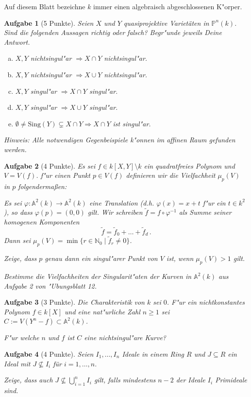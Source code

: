 \documentclass[a4paper, 12pt, numbers=noendperiod, chapterprefix=true, headsepline]{scrbook}
\theoremstyle{break}
\newtheorem{Aufg}{Aufgabe}
\theoremstyle{nonumberbreak}
\theoremstyle{nonumberplain}
\newcommand{\set}[2]{\{#1\mid #2\}} %
\newcommand{\N}{\mathbb{N}}
\newcommand{\A}{\mathbb{A}}
\newcommand{\IP}{\mathbb{P}}%
\begin{document}
Auf diesem Blatt bezeichne $k$ immer einen algebraisch abgeschlossenen K"orper.

\begin{Aufg}[5 Punkte]
Seien $X$ und $Y$ quasiprojektive Variet\"aten in $\IP^n(k)$. Sind die folgenden Aussagen richtig oder falsch? Begr"unde jeweils Deine Antwort.
\begin{enumerate}[a)]
	\item $X,Y$ nichtsingul"ar $\Rightarrow X \cap Y$ nichtsingul"ar.
	\item $X,Y$ nichtsingul"ar $\Rightarrow X \cup Y$ nichtsingul"ar.
	\item $X,Y$ singul"ar $\Rightarrow X \cap Y$ singul"ar.
	\item $X,Y$ singul"ar $\Rightarrow X \cup Y$ singul"ar.
	\item $\emptyset \neq \textrm{Sing}(Y) \subsetneq X \cap Y \Rightarrow X \cap Y$ ist singul"ar.
\end{enumerate}
\emph{Hinweis:} Alle notwendigen Gegenbeispiele k"onnen im affinen Raum gefunden werden.
\end{Aufg}

\begin{Aufg}[4 Punkte]
Es sei $f\in k[X,Y] \setminus k$ ein quadratfreies Polynom und $V = V(f)$. f"ur einen Punkt $p \in V(f)$ definieren wir die Vielfachheit $\mu_p(V)$ in $p$ folgenderma\ss en: 

Es sei $\varphi \colon \A^2(k)\to \A^2(k)$ eine Translation (d.h. $\varphi(x) = x + t$ f"ur ein $t\in k^2$), so dass $\varphi(p) = (0,0)$ gilt. Wir schreiben $\tilde f = f\circ \varphi^{-1}$ als Summe seiner homogenen Komponenten
	\[\tilde f = \tilde f_0 +\dots + \tilde f_d\,.\]
Dann sei $\mu_p(V) = \min\set{r\in \N_0}{\tilde f_r \neq 0}$.

Zeige, dass $p$ genau dann ein singul"arer Punkt von $V$ ist, wenn $\mu_p(V) > 1$ gilt.

Bestimme die Vielfachheiten der Singularit"aten der Kurven in $\A^2(k)$ aus Aufgabe 2 von "Ubungsblatt 12.
\end{Aufg}

\begin{Aufg}[3 Punkte]
Die Charakteristik von $k$ sei $0$. F"ur ein nichtkonstantes Polynom $f\in k[X]$ und eine nat"urliche Zahl $n\geq 1$ sei $C := V(Y^n - f)\subset \A^2(k)$. 

F"ur welche $n$ und $f$ ist $C$ eine nichtsingul"are Kurve?
\end{Aufg}

\begin{Aufg}[4 Punkte]
Seien $I_1,\ldots, I_n$ Ideale in einem Ring $R$ und $J \subseteq R$ ein Ideal mit $J \nsubseteq I_i$ für $i=1,\ldots,n$. 

Zeige, dass auch $J \nsubseteq\bigcup_{i=1}^n I_i$ gilt, falls mindestens $n-2$ der Ideale $I_i$ Primideale sind.
\end{Aufg}
\end{document}
